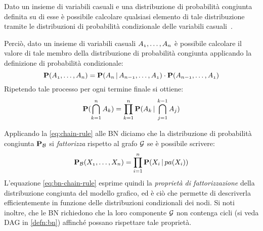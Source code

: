 \begin{teorema}
Dato un insieme di variabili casuali e una distribuzione di probabilità congiunta definita su di esse è possibile calcolare qualsiasi elemento di tale distribuzione tramite le distribuzioni di probabilità condizionale delle variabili casuali~\cite{Russel2003}.
\end{teorema}

Perciò, dato un insieme di variabili casuali $\mathnormal{A_1},\dotsc,\mathnormal{A_n}$ è possibile calcolare il valore di tale membro della distribuzione di probabilità congiunta applicando la definizione di probabilità condizionale:
\[
\mathbf{P}(\mathnormal{A_1},\dotsc,\mathnormal{A_n})=\mathbf{P}(\mathnormal{A_n}\,\arrowvert\,\mathnormal{A_{n-1}},\dotsc,\mathnormal{A_1})\cdot\mathbf{P}(\mathnormal{A_{n-1}},\dotsc,\mathnormal{A_1})
\]
Ripetendo tale processo per ogni termine finale si ottiene:
\begin{equation}
\label{eq:chain-rule}
\mathbf{P}(\bigcap_{k=1}^{n}\mathnormal{A_k})=\prod_{k=1}^{n}\mathbf{P}(\mathnormal{A_k}\,\arrowvert\,\bigcap_{j=1}^{k-1}\mathnormal{A_j})
\end{equation}

Applicando la \eqref{eq:chain-rule} alle \acl{BN} diciamo che la distribuzione di probabilità congiunta $\mathbf{P}_{\mathcal{B}}$ si \emph{fattorizza} rispetto al grafo $\mathcal{G}$ se è possibile scrivere:
\begin{equation}
\label{eq:bn-chain-rule}
\mathbf{P}_{\mathcal{B}}(\mathnormal{X_1}, \dotsc, \mathnormal{X_n})=\prod_{i=1}^{n}\mathbf{P}(\mathnormal{X_i}\,\arrowvert\,pa(\mathnormal{X_i}))
\end{equation}
L'equazione \eqref{eq:bn-chain-rule} esprime quindi la \emph{proprietà di fattorizzazione} della distribuzione congiunta del modello grafico, ed è ciò che permette di descriverla efficientemente in funzione delle distribuzioni condizionali dei nodi. Si noti inoltre, che le \acl{BN} richiedono che la loro componente $\mathcal{G}$ non contenga cicli (si veda \acs{DAG} in \ref{defn:bn}) affinché possano rispettare tale proprietà.

